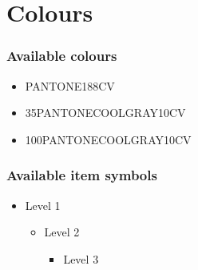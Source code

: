 \documentclass{beamer}
\begin{document}
\section{Colours}

\begin{frame}
\frametitle{Available colours}
\begin{itemize}
    \item {\color{PANTONE188CV} PANTONE188CV}
    \item {\color{35PANTONECOOLGRAY10CV} 35PANTONECOOLGRAY10CV}
    \item {\color{100PANTONECOOLGRAY10CV} 100PANTONECOOLGRAY10CV}
\end{itemize}
\end{frame}

\begin{frame}
\frametitle{Available item symbols}
\begin{itemize}
    \item Level 1
    \begin{itemize}
      \item Level 2
        \begin{itemize}
          \item Level 3
        \end{itemize}
    \end{itemize}
\end{itemize}
\end{frame}
\end{document}
